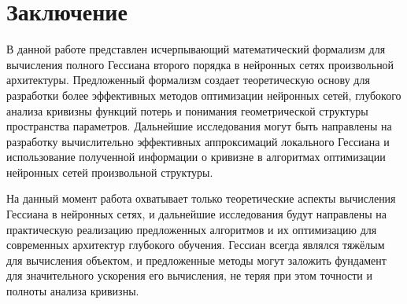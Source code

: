 \documentclass[11pt]{article}
\begin{document}
\section{Заключение}

В данной работе представлен исчерпывающий математический формализм для вычисления полного Гессиана второго
порядка в нейронных сетях произвольной архитектуры.
Предложенный формализм создает теоретическую основу для разработки более эффективных методов оптимизации
нейронных сетей, глубокого анализа кривизны функций потерь и понимания геометрической структуры пространства
параметров. Дальнейшие исследования могут быть направлены на разработку вычислительно эффективных
аппроксимаций локального Гессиана и использование полученной информации о кривизне в алгоритмах оптимизации
нейронных сетей произвольной структуры.

На данный момент работа охватывает только теоретические аспекты вычисления Гессиана в нейронных сетях,
и дальнейшие исследования будут направлены на практическую реализацию предложенных алгоритмов и их
оптимизацию для современных архитектур глубокого обучения. Гессиан всегда являлся тяжёлым для вычисления
объектом, и предложенные методы могут заложить фундамент для значительного ускорения его вычисления, не
теряя при этом точности и полноты анализа кривизны.
\end{document}
